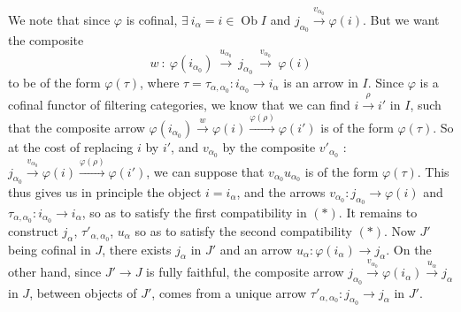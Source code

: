 \documentclass[11pt]{article}
\newcommand{\printedpage}[1]{\marginpar{\footnotesize p.~#1}}
\newcommand{\msp}[1]{\marginpar{\footnotesize [#1]}}
\newcommand{\Ob}{\operatorname{Ob}}
\begin{document}
We note that since $\varphi$ is cofinal, $\exists\ i_\alpha=i\in\Ob I$ and $j_{\alpha_0}\xrightarrow{v_{\alpha_0}}\varphi(i)$. But we want the composite
\[
w\ :\ \varphi(i_{\alpha_0})\ \xrightarrow{u_{\alpha_0}}\ j_{\alpha_0}\ \xrightarrow{v_{\alpha_0}}\ \varphi(i)
\]
to be of the form $\varphi(\tau)$, where $\tau=\tau_{\alpha,\alpha_0}:i_{\alpha_0}\longrightarrow i_\alpha$ is an arrow in $I$. Since $\varphi$ is a cofinal functor of filtering categories, we know
\printedpage{122}
\msp{page 322}
that we can find $i\xrightarrow{\rho}i'$ in $I$, such that the composite arrow $\varphi(i_{\alpha_0})\xrightarrow{w}\varphi(i)\xrightarrow{\varphi(\rho)}\varphi(i')$ is of the form $\varphi(\tau)$. So at the cost of replacing $i$ by $i'$, and $v_{\alpha_0}$ by the composite $v'_{\alpha_0}$ : $j_{\alpha_0}\xrightarrow{v_{\alpha_0}}\varphi(i)\xrightarrow{\varphi(\rho)}\varphi(i')$, we can suppose that $v_{\alpha_0}u_{\alpha_0}$ is of the form $\varphi(\tau)$. This thus gives us in principle the object $i=i_\alpha$, and the arrows $v_{\alpha_0}:j_{\alpha_0}\longrightarrow\varphi(i)$ and $\tau_{\alpha,\alpha_0}:i_{\alpha_0}\longrightarrow i_\alpha$, so as to satisfy the first compatibility in $(*)$. It remains to construct $j_\alpha$, $\tau'_{\alpha,\alpha_0}$, $u_\alpha$ so as to satisfy the second compatibility $(*)$. Now $J'$ being cofinal in $J$, there exists $j_\alpha$ in $J'$ and an arrow $u_\alpha:\varphi(i_\alpha)\longrightarrow j_\alpha$. On the other hand, since $J'\longrightarrow J$ is fully faithful, the composite arrow $j_{\alpha_0}\xrightarrow{v_{\alpha_0}}\varphi(i_\alpha)\xrightarrow{u_\alpha}j_\alpha$ in $J$, between objects of $J'$, comes from a unique arrow $\tau'_{\alpha,\alpha_0}:j_{\alpha_0}\longrightarrow j_\alpha$ in $J'$.

\msp{page 323}
\end{document}
